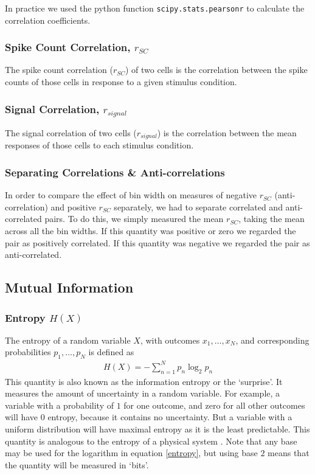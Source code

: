 \documentclass[a4paper,12pt]{article}
\theoremstyle{definition}
\begin{document}
In practice we used the python function \texttt{scipy.stats.pearsonr} to calculate the correlation coefficients.

\subsubsection{Spike Count Correlation, $r_{SC}$}
The spike count correlation ($r_{SC}$) of two cells is the correlation between the spike counts of those cells in response to a given stimulus condition.

\subsubsection{Signal Correlation, $r_{signal}$}
The signal correlation of two cells ($r_{signal}$) is the correlation between the mean responses of those cells to each stimulus condition.

\subsubsection{Separating Correlations \& Anti-correlations}\label{sec:corr_anti_corr}
In order to compare the effect of bin width on measures of negative $r_{SC}$ (anti-correlation) and positive $r_{SC}$ separately, we had to separate correlated and anti-correlated pairs. To do this, we simply measured the mean $r_{SC}$, taking the mean across all the bin widths. If this quantity was positive or zero we regarded the pair as positively correlated. If this quantity was negative we regarded the pair as anti-correlated.

\subsection{Mutual Information}
\subsubsection{Entropy $H(X)$}
The entropy of a random variable $X$, with outcomes $x_1, \dots, x_N$, and corresponding probabilities $p_1, \dots, p_N$ is defined as
\begin{align}\label{entropy}
H(X) = -\sum_{n=1}^N p_n \log _2 p_n
\end{align}
This quantity is also known as the information entropy or the `surprise'. It measures the amount of uncertainty in a random variable. For example, a variable with a probability of $1$ for one outcome, and zero for all other outcomes will have 0 entropy, because it contains no uncertainty. But a variable with a uniform distribution will have maximal entropy as it is the least predictable. This quantity is analogous to the entropy of a physical system \cite{shannon}. Note that any base may be used for the logarithm in equation \ref{entropy}, but using base $2$ means that the quantity will be measured in `bits'.
\end{document}
